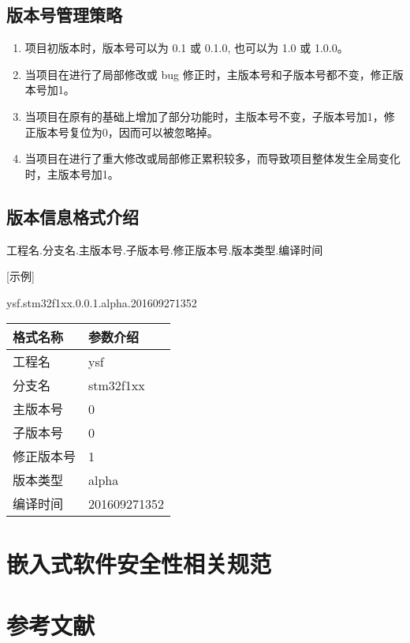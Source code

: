 \documentclass[UTF8,a4paper,12pt]{article}
\begin{document}
	\subsection{版本号管理策略}
	\begin{enumerate}
	\item 项目初版本时，版本号可以为 0.1 或 0.1.0, 也可以为 1.0 或 1.0.0。
	\item 当项目在进行了局部修改或 bug 修正时，主版本号和子版本号都不变，修正版本号加1。
	\item 当项目在原有的基础上增加了部分功能时，主版本号不变，子版本号加1，修正版本号复位为0，因而可以被忽略掉。
	\item 当项目在进行了重大修改或局部修正累积较多，而导致项目整体发生全局变化时，主版本号加1。
	\end{enumerate}
	\subsection{版本信息格式介绍}
	\begin{center}
	工程名.分支名.主版本号.子版本号.修正版本号.版本类型.编译时间\\
	\end{center}
 
	[示例]
	\begin{center}
	ysf.stm32f1xx.0.0.1.alpha.201609271352
	\end{center}

	\begin{center}
		\begin{tabular}{|p{5cm}|p{5cm}|}  
			\hline
			格式名称 & 参数介绍 \\ \hline
			工程名 & ysf \\ \hline
			分支名 & stm32f1xx \\ \hline
			主版本号 & 0 \\ \hline
			子版本号 & 0 \\ \hline
			修正版本号 & 1 \\ \hline
			版本类型 & alpha \\ \hline
			编译时间 & 201609271352 \\ \hline
		\end{tabular}
	\end{center}
	\newpage
	
	\section{嵌入式软件安全性相关规范}
	\newpage
	
	\section{参考文献}
	\newpage
\end{document}
